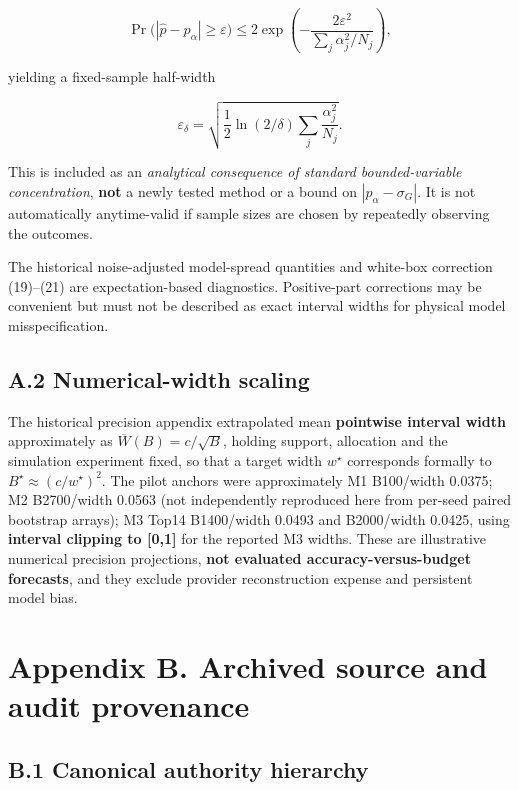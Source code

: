 \documentclass[10pt,a4paper]{article}
\begin{document}
\begin{equation*}
\Pr\bigl(|\widehat p-p_\alpha|\ge\varepsilon\bigr)
\le 2\exp\left(-\frac{2\varepsilon^2}{\sum_j\alpha_j^2/N_j}\right),
\tag{A1}
\end{equation*}

yielding a fixed-sample half-width

\begin{equation*}
\varepsilon_\delta=
\sqrt{\frac12\ln(2/\delta)\sum_j\frac{\alpha_j^2}{N_j}}.
\tag{A2}
\end{equation*}

This is included as an \emph{analytical consequence of standard bounded-variable concentration}, \textbf{not} a newly tested method or a bound on $|p_\alpha-\sigma_G|$. It is not automatically anytime-valid if sample sizes are chosen by repeatedly observing the outcomes.

The historical noise-adjusted model-spread quantities and white-box correction (19)–(21) are expectation-based diagnostics. Positive-part corrections may be convenient but must not be described as exact interval widths for physical model misspecification.

\subsection*{A.2 Numerical-width scaling}

The historical precision appendix extrapolated mean \textbf{pointwise interval width} approximately as $\overline W(B)=c/\sqrt B$, holding support, allocation and the simulation experiment fixed, so that a target width $w^\star$ corresponds formally to $B^\star\approx(c/w^\star)^2$. The pilot anchors were approximately M1 B100/width 0.0375; M2 B2700/width 0.0563 (not independently reproduced here from per-seed paired bootstrap arrays); M3 Top14 B1400/width 0.0493 and B2000/width 0.0425, using \textbf{interval clipping to [0,1]} for the reported M3 widths. These are illustrative numerical precision projections, \textbf{not evaluated accuracy-versus-budget forecasts}, and they exclude provider reconstruction expense and persistent model bias.

\section*{Appendix B. Archived source and audit provenance}

\subsection*{B.1 Canonical authority hierarchy}
\end{document}
